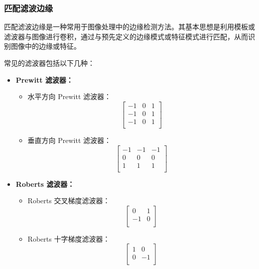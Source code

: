 \documentclass[a4paper,12pt]{article}
\begin{document}
\subsubsection{匹配滤波边缘}
匹配滤波边缘是一种常用于图像处理中的边缘检测方法。其基本思想是利用模板或滤波器与图像进行卷积，通过与预先定义的边缘模式或特征模式进行匹配，从而识别图像中的边缘或特征。

常见的滤波器包括以下几种：

\begin{itemize}
    \item \textbf{Prewitt 滤波器：}
    \begin{itemize}
        \item 水平方向 Prewitt 滤波器：
        \[
        \begin{bmatrix}
        -1 & 0 & 1 \\
        -1 & 0 & 1 \\
        -1 & 0 & 1 \\
        \end{bmatrix}
        \]
        
        \item 垂直方向 Prewitt 滤波器：
        \[
        \begin{bmatrix}
        -1 & -1 & -1 \\
        0 & 0 & 0 \\
        1 & 1 & 1 \\
        \end{bmatrix}
        \]
    \end{itemize}

    \item \textbf{Roberts 滤波器：}
    \begin{itemize}
        \item Roberts 交叉梯度滤波器：
        \[
        \begin{bmatrix}
        0 & 1 \\
        -1 & 0 \\
        \end{bmatrix}
        \]
        
        \item Roberts 十字梯度滤波器：
        \[
        \begin{bmatrix}
        1 & 0 \\
        0 & -1 \\
        \end{bmatrix}
        \]
    \end{itemize}
\end{itemize}
\end{document}
